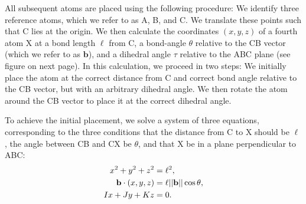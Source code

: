 \documentclass[12pt]{article}
\begin{document}
All subsequent atoms are placed using the following procedure: We identify three reference atoms, which we refer to as A, B, and C. We translate these points such that C lies at the origin. We then calculate the coordinates $(x, y, z)$ of a fourth atom X at a bond length $\ell$ from C, a bond-angle $\theta$ relative to the CB vector (which we refer to as $\mathbf{b}$), and a dihedral angle $\tau$ relative to the ABC plane (see figure on next page). In this calculation, we proceed in two steps: We initially place the atom at the correct distance from C and correct bond angle relative to the CB vector, but with an arbitrary dihedral angle. We then rotate the atom around the CB vector to place it at the correct dihedral angle.

To achieve the initial placement, we solve a system of three equations, corresponding to the three conditions that the distance from C to X should be $\ell$, the angle between CB and CX be $\theta$, and that X be in a plane perpendicular to ABC:
\begin{align}
x^2 + y^2 + z^2 &= \ell^2, \label{eq:dist}\\
{\bf b} \cdot (x,y,z) &= \ell  ||{\bf b}|| \cos{\theta}, \label{eq:angle}\\
Ix + Jy +Kz &=0. \label{eq:plane}
\end{align}

\bigskip
\end{document}
